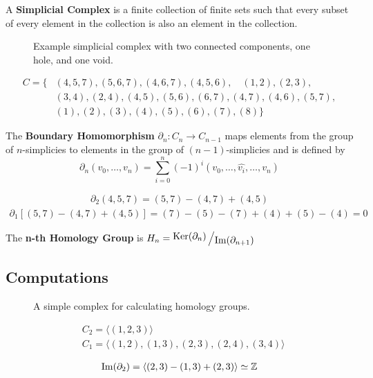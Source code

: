 \begin{frame}
	\begin{definition}
		A \textbf{Simplicial Complex} is a finite collection of finite sets such that every subset of every element in the collection is also an element in the collection. \cite{wagner}
	\end{definition}
	\begin{figure}
		
		\caption{Example simplicial complex with two connected components, one hole, and one void.}
	\end{figure}
	\begin{align*}
		C = \{
			&(4,5,7), (5,6,7), (4,6,7), (4,5,6),\quad (1,2), (2,3),\\ &(3,4), (2,4), (4,5), (5,6),(6,7),(4,7),(4,6),(5,7),\\
			&(1), (2), (3), (4), (5), (6), (7), (8)
		\}
	\end{align*}
\end{frame}

\begin{frame}
	\begin{definition}
		The \textbf{Boundary Homomorphism} \(\partial_n : C_n \to C_{n-1}\) maps elements from the group of \(n\)-simplicies to elements in the group of \((n-1)\)-simplicies and is defined by
		\[
			\partial_n (v_0,\dots , v_{n}) = \sum_{i=0}^n (-1)^{i}
			(v_0,\dots, \widehat{v_i}, \dots, v_n)
		\]
		\cite{hatcher}
	\end{definition}
	\begin{align*}
		\partial_2 (4,5,7) = (5,7) - (4,7) + (4,5)
	\end{align*}
	\begin{align*}
		\partial_1 [(5,7) - (4,7) + (4,5)] = (7) - (5) - (7) + (4) + (5) - (4) = 0
	\end{align*}
\end{frame}

\begin{frame}
	\begin{definition}
		The \textbf{n-th Homology Group} is \(H_n = \bigslant{\Ker(\partial_n)}{\Ima(\partial_{n+1})}\)
		\cite{fraleigha}
	\end{definition}
\end{frame}

\subsection{Computations}
\begin{frame}
	\begin{figure}
		
		\caption{A simple complex for calculating homology groups.}
	\end{figure}
	\begin{align*}
		&C_2 = \langle (1,2,3) \rangle \\
		&C_1 = \langle (1,2),(1,3),(2,3),(2,4),(3,4) \rangle \\
	\end{align*}
	\begin{align*}
		\operatorname{Im} (\partial_2) = \langle (2,3) - (1,3) + (2,3) \rangle \simeq \mathbb{Z}
	\end{align*}
\end{frame}

